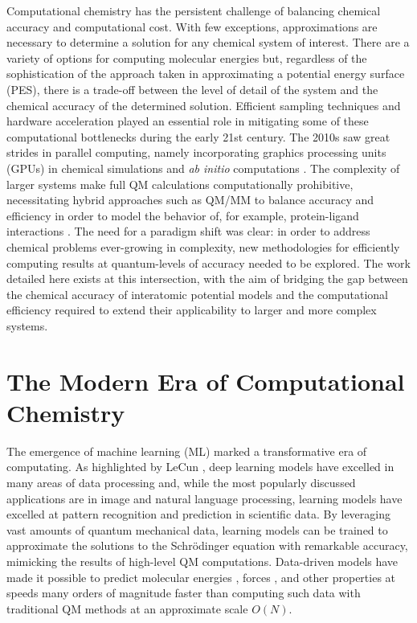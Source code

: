 Computational chemistry has the persistent challenge of balancing chemical accuracy and computational cost. 
With few exceptions, approximations are necessary to determine a solution for any chemical system of interest. 
There are a variety of options for computing molecular energies but, regardless of the sophistication of the approach taken in approximating a potential energy surface (PES), there is a trade-off between the level of detail of the system and the chemical accuracy of the determined solution.
Efficient sampling techniques \cite{remd_adrian1, remd_adrian2, remd_umbrella} 
and hardware acceleration \cite{gpu_dft, gpu_quantum_chem1, gpu_quantum_chem2} 
played an essential role in mitigating some of these computational bottlenecks during the early 21st century.
The 2010s saw great strides in parallel computing, namely incorporating graphics processing units (GPUs) in chemical simulations \cite{ gpu_accelerated_AMBER, gpu_accelerated_AMBER18}
and \textit{ab initio} computations \cite{parallel_ab_initio_luehr}. 
The  complexity of larger systems make full QM calculations computationally prohibitive, necessitating hybrid approaches such as QM/MM to balance accuracy and efficiency in order to model the behavior of, for example, protein-ligand interactions \cite{dft_qm_mm_roitberg} .
The need for a paradigm shift was clear: in order to address chemical problems ever-growing in complexity, new methodologies for efficiently computing results at quantum-levels of accuracy needed to be explored.
The work detailed here exists at this intersection, with the aim of bridging the gap between the chemical accuracy of interatomic potential models and the computational efficiency required to extend their applicability to larger and more complex systems. 

\section{The Modern Era of Computational Chemistry}
The emergence of machine learning (ML) marked a transformative era of computating. 
As highlighted by LeCun \cite{deep_learning_lecun}, deep learning models have excelled in many areas of data processing and, while the most popularly discussed applications are in image and natural language processing, learning models have excelled at pattern recognition and prediction in scientific data.
By leveraging vast amounts of quantum mechanical data, learning models can be trained to approximate the solutions to the Schrödinger equation with remarkable accuracy, mimicking the results of high-level QM computations.
Data-driven models have made it possible to predict molecular energies \cite{deep_tensor_NNs_schutt, prediction_errors_ml_lower_than_dft_faber, ml_atomization_energies_rupp}, 
forces \cite{interatomic_ff_ML_glielmo, md_onthefly_ml_forces_li}, 
and other properties \cite{PerSpect_ml, TensorMol}
at speeds many orders of magnitude faster than computing such data with traditional QM methods at an approximate scale $O(N)$. 



